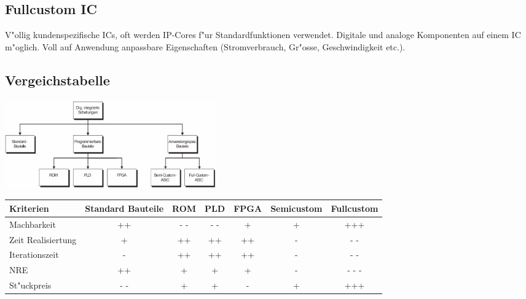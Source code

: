 \subsection{Fullcustom IC}
V"ollig kundenspezifische ICs, oft werden IP-Cores f"ur Standardfunktionen verwendet. Digitale und analoge Komponenten auf einem IC m"oglich. Voll auf Anwendung anpassbare Eigenschaften (Stromverbrauch, Gr"osse, Geschwindigkeit etc.).

\subsection{Vergeichstabelle}

\begin{center}
	\includegraphics[width=0.40\textwidth]{pics/devicecomparetables}
	
	\begin{tabular}{|l|c|c|c|c|c|c|}
		\hline
		Kriterien & Standard Bauteile & ROM & PLD & FPGA & Semicustom & Fullcustom \\
		\hline
		Machbarkeit & ++ & - - & - - & + & + & +++ \\
		\hline
		Zeit Realisiertung & + & ++ & ++ & ++ & - & - - \\
		\hline
		Iterationszeit & - & ++ & ++ & ++ & - & - - \\
		\hline
		NRE & ++ & + & + & + & - & - - -\\
		\hline
		St"uckpreis & - - & + & + & - & + & +++ \\
		\hline
	\end{tabular}
\end{center}
	